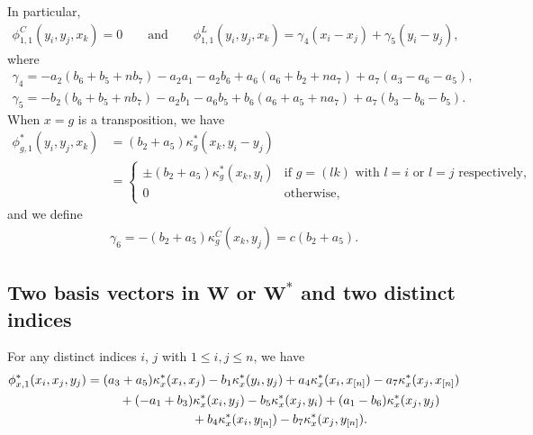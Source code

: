 \documentclass[pdftex]{sigma}
\numberwithin{equation}{section}
\begin{document}
In particular,
\begin{gather*}
\phi_{1,1}^C(y_i,y_j,x_k)
=0 \qquad \text{and} \qquad \phi_{1,1}^L(y_i,y_j,x_k)
=\gamma_4(x_i-x_j)+\gamma_5(y_i-y_j),
\end{gather*}
where
\begin{gather*}
\gamma_4=-a_2(b_6 + b_5 + nb_7) - a_2 a_1 - a_2 b_6 + a_6(a_6 + b_2 + na_7) + a_7(a_3 - a_6 - a_5), \\
\gamma_5=-b_2(b_6 + b_5 + nb_7) - a_2 b_1 - a_6 b_5 + b_6(a_6 + a_5 + na_7) + a_7(b_3 - b_6 - b_5).
\end{gather*}
When $x=g$ is a transposition, we have
\begin{align*}
\phi_{g,1}^*(y_i,y_j,x_k)&=(b_2 + a_5)\kappa^*_g(x_k,y_i-y_j) \\
&=
\begin{cases}
 \pm(b_2 + a_5)\kappa^*_g(x_k,y_l) & \text{if\ \ $g=(lk)$\ \ with\ \ $l=i$\ \ or\ \ $l=j$\ \ respectively}, \\
 0 & \text{otherwise},
\end{cases}
\end{align*}
and we define
\begin{gather*}
\gamma_6=-(b_2 + a_5)\kappa_g^C(x_k,y_j)=c(b_2 + a_5).
\end{gather*}

\subsection[Two basis vectors in W or W^* and two distinct indices]
{Two basis vectors in $\boldsymbol W$ or $\boldsymbol {W^*}$ and two distinct indices}\label{TwoVecInWTwoIndices}

For any distinct indices $i$, $j$ with $1 \leq i, j \leq n$, we have
\begin{gather*}
\phi_{x,1}^*(x_i,x_j,y_j)
=(a_3+a_5) \kappa^*_x(x_i,x_j) - b_1 \kappa^*_x(y_i,y_j) + a_4 \kappa^*_x(x_i,x_{[n]}) - a_7 \kappa^*_x(x_j,x_{[n]})
\\ \hphantom{\phi_{x,1}^*(x_i,x_j,y_j)=}
{}+(-a_1+b_3) \kappa^*_x(x_i,y_j) - b_5 \kappa^*_x(x_j,y_i) + (a_1-b_6) \kappa^*_x(x_j,y_j)
\\ \hphantom{\phi_{x,1}^*(x_i,x_j,y_j)=}
{}+ b_4 \kappa^*_x(x_i,y_{[n]}) - b_7 \kappa^*_x(x_j,y_{[n]}).
\end{gather*}
\end{document}
